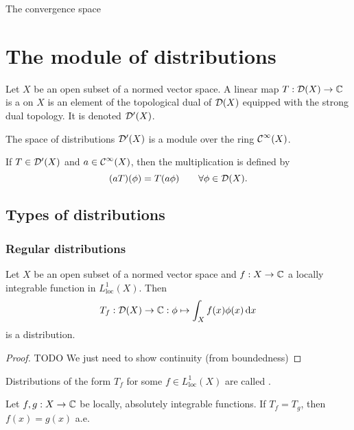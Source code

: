\begin{lemma}
The convergence space
\end{lemma}



\section{The module of distributions}
\begin{definition}
    Let $X$ be an open subset of a normed vector space.
    A linear map $T: \operatorname{\mathcal{D}}(X) \to \mathbb{C}$ is a  on $X$ is an element of the topological dual of $\operatorname{\mathcal{D}}(X)$ equipped with the strong dual topology. It is denoted $\operatorname{\mathcal{D}^\prime}(X)$.
\end{definition}

\begin{proposition}
    The space of distributions $\operatorname{\mathcal{D}^\prime}(X)$ is a module over the ring $\operatorname{\mathcal{C}}^\infty(X)$.
    
    If $T\in \operatorname{\mathcal{D}^\prime}(X)$ and $a\in \operatorname{\mathcal{C}}^\infty(X)$, then the multiplication is defined by
    \[ (aT)(\phi) = T(a\phi) \qquad \forall \phi \in \operatorname{\mathcal{D}}(X). \]
\end{proposition}

\subsection{Types of distributions}
\subsubsection{Regular distributions}
\begin{lemma}
Let $X$ be an open subset of a normed vector space and $f: X\to\mathbb{C}$ a locally integrable function in $L^1_\text{loc}(X)$. Then
\[ T_f: \operatorname{\mathcal{D}}(X) \to \mathbb{C}: \phi \mapsto \int_X f(x)\phi(x)\operatorname{d \!}{x} \]
is a distribution.
\end{lemma}
\begin{proof}
TODO We just need to show continuity (from boundedness)
\end{proof}

\begin{definition}
Distributions of the form $T_f$ for some $f\in L^1_\text{loc}(X)$ are called .
\end{definition}


\begin{lemma} \label{uniquenessIntegratedFunction}
Let $f,g: X\to \mathbb{C}$ be locally, absolutely integrable functions. If $T_f = T_g$, then $f(x) = g(x)$ a.e.
\end{lemma}

